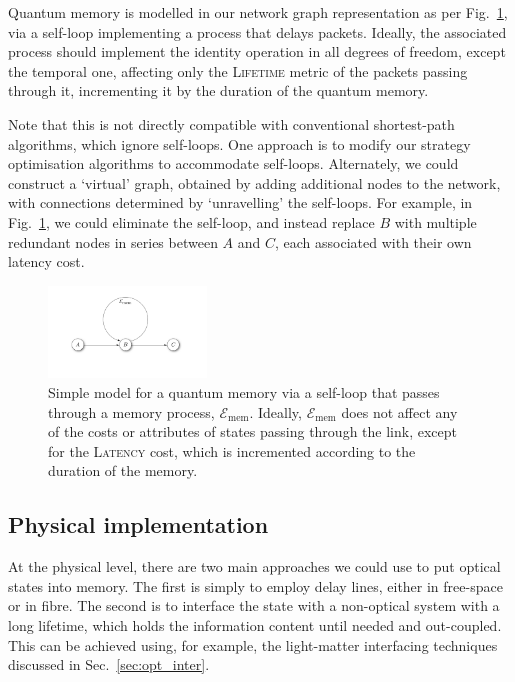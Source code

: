 Quantum memory is modelled in our network graph representation as per Fig.~\ref{fig:memory}, via a self-loop implementing a process that delays packets. Ideally, the associated process should implement the identity operation in all degrees of freedom, except the temporal one, affecting only the \textsc{Lifetime} metric of the packets passing through it, incrementing it by the duration of the quantum memory.

Note that this is not directly compatible with conventional shortest-path algorithms, which ignore self-loops. One approach is to modify our strategy optimisation algorithms to accommodate self-loops. Alternately, we could construct a `virtual' graph, obtained by adding additional nodes to the network, with connections determined by `unravelling' the self-loops. For example, in Fig.~\ref{fig:memory}, we could eliminate the self-loop, and instead replace $B$ with multiple redundant nodes in series between $A$ and $C$, each associated with their own latency cost.

\begin{figure}[!htbp]
\includegraphics[width=0.375\textwidth]{memory}
\caption{Simple model for a quantum memory via a self-loop that passes through a memory process, $\mathcal{E}_\mathrm{mem}$. Ideally, $\mathcal{E}_\mathrm{mem}$ does not affect any of the costs or attributes of states passing through the link, except for the \textsc{Latency} cost, which is incremented according to the duration of the memory.} \label{fig:memory}
\end{figure}

%
%

\subsection{Physical implementation}

At the physical level, there are two main approaches we could use to put optical states into memory. The first is simply to employ delay lines, either in free-space or in fibre. The second is to interface the state with a non-optical system with a long lifetime, which holds the information content until needed and out-coupled. This can be achieved using, for example, the light-matter interfacing techniques discussed in Sec.~\ref{sec:opt_inter}.

